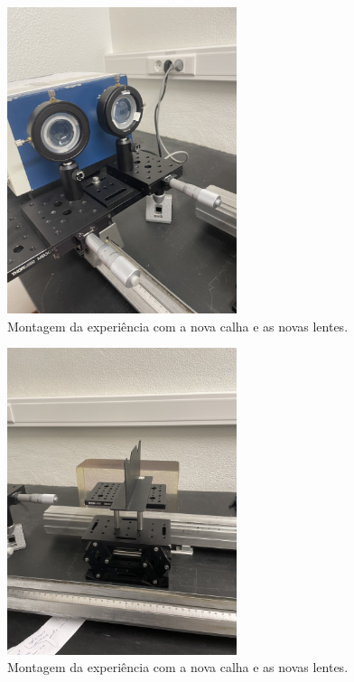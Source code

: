 \documentclass[12pt,a4paper,oneside]{paper}
\begin{document}
\begin{figure}[H]
    \centering
    \includegraphics[width=0.6\textwidth]{IMG_2864.jpg}
    \caption{Montagem da experiência com a nova calha e as novas lentes.}
    \label{fig:montagem}
\end{figure}

\begin{figure}[H]
    \centering
    \includegraphics[width=0.6\textwidth]{IMG_2868.jpg}
    \caption{Montagem da experiência com a nova calha e as novas lentes.}
    \label{fig:montagem}
\end{figure}
\end{document}
